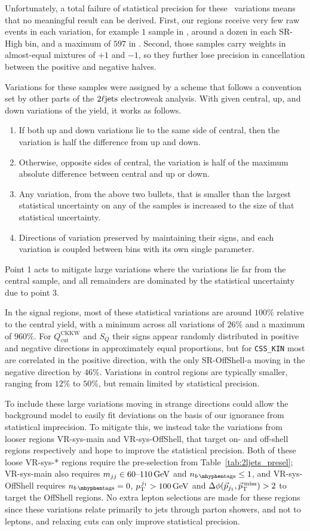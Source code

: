 Unfortunately, a total failure of statistical precision for these \diboson\
variations means that no meaningful result can be derived.
First, our regions receive very few raw events in each variation,
for example $1$ sample in \srllbb, around a dozen in
each SR-High bin, and a maximum of $597$ in \crvz.
Second, those samples carry weights in almost-equal mixtures of $+1$ and $-1$,
so they further lose precision in cancellation between the positive and
negative halves.

Variations for these samples were assigned by a scheme that follows a
convention set by other parts of the $\twoljets$ electroweak analysis.
With given central, up, and down variations of the yield, it works as
follows.
\begin{enumerate}
\item If both up and down variations lie to the same side of central, then
the variation is half the difference from up and down.
\item Otherwise, opposite sides of central, the variation is half of the
maximum absolute difference between central and up or down.
\item Any variation, from the above two bullets, that is smaller than the
largest statistical uncertainty on any of the samples is increased to the size
of that statistical uncertainty.
\item Directions of variation preserved by maintaining their signs, and
each variation is coupled between bins with its own single parameter.
\end{enumerate}
Point 1 acts to mitigate large variations where the variations lie far from
the central sample,
and all remainders are dominated by the statistical uncertainty due to point 3.

In the signal regions, most of these statistical variations are around
$100\%$ relative to the central yield, with a minimum across all variations
of $26\%$ and a maximum of $960\%$.
For $Q_\textrm{cut}^\textrm{CKKW}$ and $S_Q$ their signs appear randomly
distributed in positive and negative directions in approximately equal
proportions, but for \texttt{CSS\_KIN} most are correlated in the positive
direction, with the only SR-OffShell-a moving in the negative direction by
$46\%$.
Variations in control regions are typically smaller, ranging from $12\%$ to
$50\%$, but remain limited by statistical precision.

To include these large variations moving in strange directions could allow the
background model to easily fit deviations on the basis of our ignorance
from statistical imprecision.
To mitigate this, we instead take the variations from looser regions
VR-sys-main and VR-sys-OffShell, that target on- and off-shell regions
respectively and hope to improve the statistical precision.
Both of these loose VR-sys-* regions require the pre-selection from
Table~\ref{tab:2ljets_presel};
VR-sys-main also requires
$\mjj \in 60\textrm{--}110\,\eV[G]$ and $\nbtag \leq 1$,
and VR-sys-OffShell requires
$\nbtag = 0$, $\ptjone > 100\,\eV[G]$ and $\dphijmet > 2$ to target the
OffShell regions.
No extra lepton selections are made for these regions since these variations
relate primarily to jets through parton showers, and not to leptons, and
relaxing cuts can only improve statistical precision.

